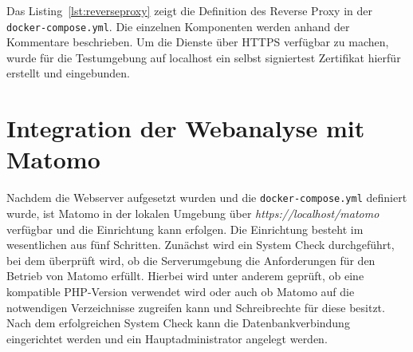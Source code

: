 Das Listing~\ref{lst:reverseproxy} zeigt die Definition des Reverse Proxy in der \texttt{docker-compose.yml}. Die einzelnen Komponenten werden anhand der Kommentare beschrieben. Um die Dienste über HTTPS verfügbar zu machen, wurde für die Testumgebung auf localhost ein selbst signiertest Zertifikat hierfür erstellt und eingebunden.

\section{Integration der Webanalyse mit Matomo}
Nachdem die Webserver aufgesetzt wurden und die \texttt{docker-compose.yml} definiert wurde, ist Matomo in der lokalen Umgebung über \textit{https://localhost/matomo} verfügbar und die Einrichtung kann erfolgen. Die Einrichtung besteht im wesentlichen aus fünf Schritten. Zunächst wird ein System Check durchgeführt, bei dem überprüft wird, ob die Serverumgebung die Anforderungen für den Betrieb von Matomo erfüllt. Hierbei wird unter anderem geprüft, ob eine kompatible PHP-Version verwendet wird oder auch ob Matomo auf die notwendigen Verzeichnisse zugreifen kann und Schreibrechte für diese besitzt. Nach dem erfolgreichen System Check kann die Datenbankverbindung eingerichtet werden und ein Hauptadministrator angelegt werden. 

